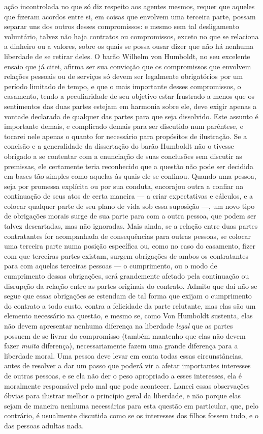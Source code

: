 ação incontrolada no que só diz respeito aos agentes mesmos, requer que
aqueles que fizeram acordos entre si, em coisas que envolvem uma
terceira parte, possam separar uns dos outros desses compromissos: e
mesmo sem tal desligamento voluntário, talvez não haja contratos ou
compromissos, exceto no que se relaciona a dinheiro ou a valores, sobre os quais
se possa ousar dizer que não há nenhuma liberdade de se
retirar deles. O barão Wilhelm von Humboldt, no seu excelente ensaio que
já citei, afirma ser sua convicção que os compromissos que envolvem
relações pessoais ou de serviços só devem ser legalmente obrigatórios
por um período limitado de tempo, e que o mais importante desses
compromissos, o casamento, tendo a peculiaridade de seu objetivo estar
frustrado a menos que os sentimentos das duas partes estejam em
harmonia sobre ele, deve exigir apenas a vontade declarada de qualquer
das partes para que seja dissolvido. Este assunto é importante demais,
e complicado demais para ser discutido num parêntese, e tocarei nele
apenas o quanto for necessário para propósitos de ilustração. Se a
concisão e a generalidade da dissertação do barão Humboldt não o
tivesse obrigado a se contentar com a enunciação de suas conclusões sem
discutir as premissas, ele certamente teria reconhecido que a questão
não pode ser decidida em bases tão simples como aquelas às quais ele se
confinou. Quando uma pessoa, seja por promessa explícita ou por sua
conduta, encorajou outra a confiar na continuação de seus atos de certa
maneira --- a criar expectativas e cálculos, e a colocar qualquer parte de
seu plano de vida sob essa suposição ---, um novo tipo de obrigações
morais surge de sua parte para com a outra pessoa, que podem ser talvez
descartadas, mas não ignoradas. Mais ainda, se a relação entre duas
partes contratantes for acompanhada de consequências para outras
pessoas, se colocar uma terceira parte numa posição específica ou, como
no caso do casamento, fizer com que terceiras partes existam, surgem
obrigações de ambos os contratantes para com aquelas
terceiras pessoas --- o cumprimento, ou o modo de cumprimento dessas
obrigações, será grandemente afetado pela continuação ou disrupção da
relação entre as partes originais do contrato. Admito que daí não se
segue que essas obrigações se estendam de tal forma que exijam o
cumprimento do contrato a todo custo, contra a felicidade da parte
relutante, mas elas são um elemento necessário na questão, e mesmo se,
como Von Humboldt sustenta, elas não devem apresentar nenhuma
diferença na liberdade \textit{legal} que as partes possuem de se
livrar do compromisso (também mantenho que elas não devem fazer
\textit{muita} diferença), necessariamente fazem uma grande
diferença para a liberdade moral. Uma pessoa deve levar em conta todas
essas circunstâncias, antes de resolver a dar um passo que poderá
vir a afetar importantes interesses de outras pessoas, e se ela não der
o peso apropriado a esses interesses, ela é moralmente responsável pelo
mal que pode acontecer. Lancei essas observações óbvias para ilustrar
melhor o princípio geral da liberdade, e não porque elas sejam de
maneira nenhuma necessárias para esta questão em particular, que, pelo
contrário, é usualmente discutida como se os interesses dos filhos
fossem tudo, e o das pessoas adultas nada. 

